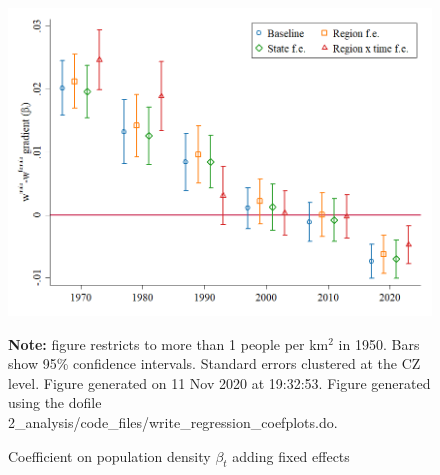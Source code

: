 \begin{figure}[!h]
\centering
\caption{Coefficient on population density $ \beta_t $ adding fixed effects}
\includegraphics[width=1\textwidth]{../2_analysis/output/figures/baseline_fe_l_czone_density_full_time}
\par \begin{minipage}[h]{\textwidth}{\tiny\textbf{Note:} figure restricts to more than 1 people per km$^2$ in 1950. Bars show 95\% confidence intervals. Standard errors clustered at the CZ level. Figure generated on 11 Nov 2020 at 19:32:53. Figure generated using the dofile 2\_analysis/code\_files/write\_regression\_coefplots.do.}\end{minipage}
\end{figure}
